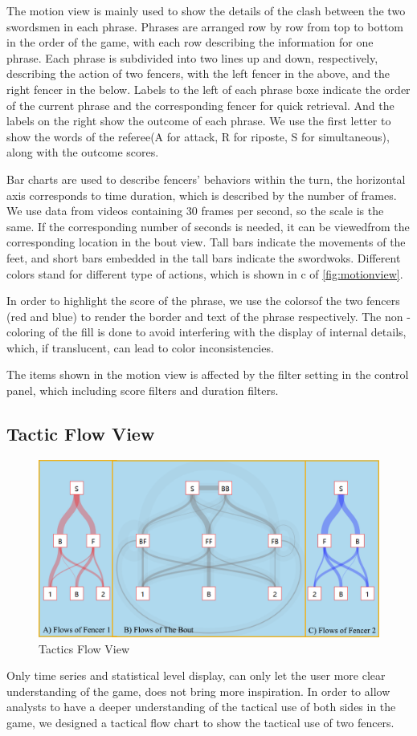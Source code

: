\documentclass[journal]{vgtc}                %
\begin{document}
The motion view is mainly used to show the details of the clash between the two swordsmen in each phrase.
Phrases are arranged row by row from top to bottom in the order of the game, with each row describing the information for one phrase.
Each phrase is subdivided into two lines up and down, respectively, describing the action of two fencers, with the left fencer in the above, and the right fencer in the below.
Labels to the left of each phrase boxe indicate the order of the current phrase and the corresponding fencer for quick retrieval.
And the labels on the right show the outcome of each phrase. We use the first letter to show the  words of the referee(A for attack, R for riposte, S for simultaneous), along with the outcome scores.

Bar charts are used to describe fencers' behaviors within the turn, the horizontal axis corresponds to time duration, which is described by the number of frames.
We use data from videos containing 30 frames per second, so the scale is the same.
If the corresponding number of seconds is needed, it can be viewedfrom the corresponding location  in the bout view.
Tall bars indicate the movements of the feet, and short bars embedded in the tall bars indicate the swordwoks. Different colors stand for different type of actions, which is shown in c of \autoref{fig:motionview}.

In order to highlight the score of the phrase, we use the colorsof the two fencers (red and blue) to render the border and text of the phrase respectively.
The non - coloring of the fill is done to avoid interfering with the display of internal details, which, if translucent, can lead to color inconsistencies.

The items shown in the motion view is affected by the filter setting in the control panel, which including score filters and duration filters.

\subsection{Tactic Flow View}
\begin{figure}[tb]
	\centering
	\includegraphics[width=\linewidth]{flowchart}
	\caption{Tactics Flow View}
	\label{fig:flowchart}
\end{figure}
Only time series and statistical level display, can only let the user more clear understanding of the game, does not bring more inspiration.
In order to allow analysts to have a deeper understanding of the tactical use of both sides in the game, we designed a tactical flow chart to show the tactical use of two fencers.
\end{document}
